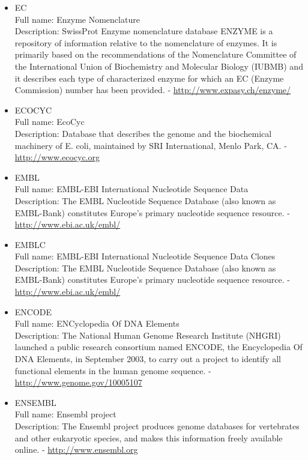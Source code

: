 \begin{itemize}
\item{EC}\\ Full name: Enzyme Nomenclature\\ Description: SwissProt Enzyme nomenclature database ENZYME is a repository of information relative to the nomenclature of enzymes. It is primarily based on the recommendations of the Nomenclature Committee of the International Union of Biochemistry and Molecular Biology (IUBMB) and it describes each type of characterized enzyme for which an EC (Enzyme Commission) number has been provided. - 
\url{http://www.expasy.ch/enzyme/}

\item{ECOCYC}\\ Full name: EcoCyc\\ Description: Database that describes the genome and the biochemical machinery of E. coli, maintained by SRI International, Menlo Park, CA. - 
\url{http://www.ecocyc.org}

\item{EMBL}\\ Full name: EMBL-EBI International Nucleotide Sequence Data\\ Description: The EMBL Nucleotide Sequence Database (also known as EMBL-Bank) constitutes Europe's primary nucleotide sequence resource. - 
\url{http://www.ebi.ac.uk/embl/}

\item{EMBLC}\\ Full name: EMBL-EBI International Nucleotide Sequence Data Clones\\ Description: The EMBL Nucleotide Sequence Database (also known as EMBL-Bank) constitutes Europe's primary nucleotide sequence resource. - 
\url{http://www.ebi.ac.uk/embl/}

\item{ENCODE}\\ Full name: ENCyclopedia Of DNA Elements\\ Description: The National Human Genome Research Institute (NHGRI) launched a public research consortium named ENCODE, the Encyclopedia Of DNA Elements, in September 2003, to carry out a project to identify all functional elements in the human genome sequence. - 
\url{http://www.genome.gov/10005107}

\item{ENSEMBL}\\ Full name: Ensembl project\\ Description: The Ensembl project produces genome databases for vertebrates and other eukaryotic species, and makes this information freely available online. - 
\url{http://www.ensembl.org}


\end{itemize}
